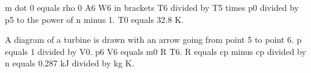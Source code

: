 m dot 0 equals rho 0 A6 W6 in brackets T6 divided by T5 times p0 divided by p5 to the power of n minus 1. T0 equals 32.8 K.

A diagram of a turbine is drawn with an arrow going from point 5 to point 6. p equals 1 divided by V0. p6 V6 equals m0 R T6. R equals cp minus cp divided by n equals 0.287 kJ divided by kg K.